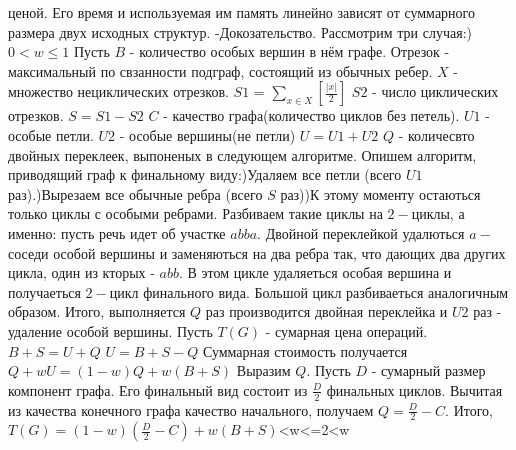 \documentclass[a4paper,12pt]{article}
\begin{document}
ценой. Его время и используемая им память линейно зависят от суммарного размера двух исходных структур.\newline
-Докозательство. Рассмотрим три случая:) $0<w\le1$\newline
Пусть $B$ - количество особых вершин в нём графе.\newline
Отрезок - максимальный по свзанности подграф, состоящий из обычных ребер.\newline
$X$ - множество нециклических отрезков.\newline
$S1$ = $\sum_{x\in X}{[\frac{|x|}{2}]}$\newline
$S2$ - число циклических отрезков.\newline
$S = S1 - S2$\newline
$C$ - качество графа(количество циклов без петель).\newline
$U1$ - особые петли.\newline
$U2$ - особые вершины(не петли)\newline
$U = U1 + U2$\newline
$Q$ - количесвто двойных переклеек, выпоненых в следующем алгоритме.\newline
Опишем алгоритм, приводящий граф к финальному виду:)Удаляем все петли (всего $U1$ раз).)Вырезаем все обычные ребра (всего $S$ раз))К этому моменту остаються только циклы с особыми ребрами. Разбиваем такие циклы на $2-$циклы, а именно: пусть
речь идет об участке $abba$. Двойной переклейкой удалються $a-$ соседи особой вершины и заменяються на два
ребра так, что дающих два других цикла, один из кторых - $abb$. В этом цикле
удаляеться особая вершина и получаеться $2-$цикл финального вида. Большой цикл разбиваеться аналогичным
образом. Итого, выполняется $Q$ раз производится двойная переклейка и $U2$ раз - удаление особой
вершины.\newline
Пусть $T(G)$ - сумарная цена операций.\newline
$B + S = U + Q$\newline
$U = B + S - Q$\newline
Суммарная стоимость получается $Q + wU = (1 - w)Q + w(B + S)$\newline
Выразим $Q$. Пусть $D$ - сумарный размер компонент графа. Его финальный вид состоит из $\frac{D}{2}$ финальных
циклов. Вычитая из качества конечного графа качество начального, получаем $Q = \frac{D}{2} - C$.\newline
Итого, $T(G) = (1 - w)(\frac{D}{2} - C) + w(B + S)$<w<=2<w\newline
\end{document}
